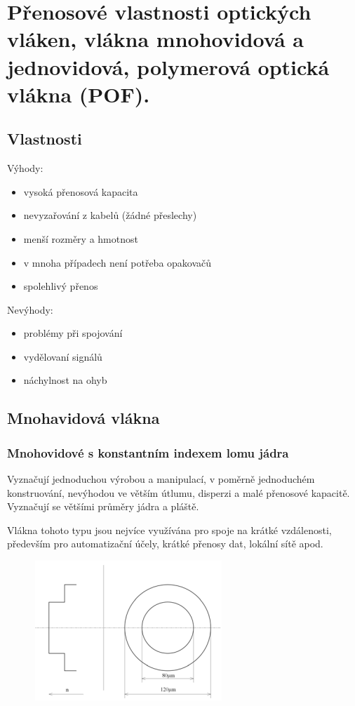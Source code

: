 \section{Přenosové vlastnosti optických vláken, vlákna mnohovidová a jednovidová, polymerová optická vlákna (POF).}

\subsection{Vlastnosti}
Výhody:
\begin{itemize}
    \item vysoká přenosová kapacita
    \item nevyzařování z kabelů (žádné přeslechy)
    \item menší rozměry a hmotnost
    \item v mnoha případech není potřeba opakovačů
    \item spolehlivý přenos
\end{itemize}
Nevýhody:
\begin{itemize}
    \item problémy při spojování
    \item vydělovaní signálů
    \item náchylnost na ohyb
\end{itemize}

\subsection{Mnohavidová vlákna}
\subsubsection{Mnohovidové s konstantním indexem lomu jádra}
Vyznačují jednoduchou výrobou a manipulací, v poměrně jednoduchém konstruování, nevýhodou ve větším útlumu, disperzi a malé přenosové kapacitě. Vyznačují se většími průměry jádra a pláště.

Vlákna tohoto typu jsou nejvíce využívána pro spoje na krátké vzdálenosti, především pro automatizační účely, krátké přenosy dat, lokální sítě apod. 

\begin{figure}[!ht]
\begin{center}
    \includegraphics[scale=1]{obrazky/mnohavid1.png}
  \end{center}
\end{figure}

